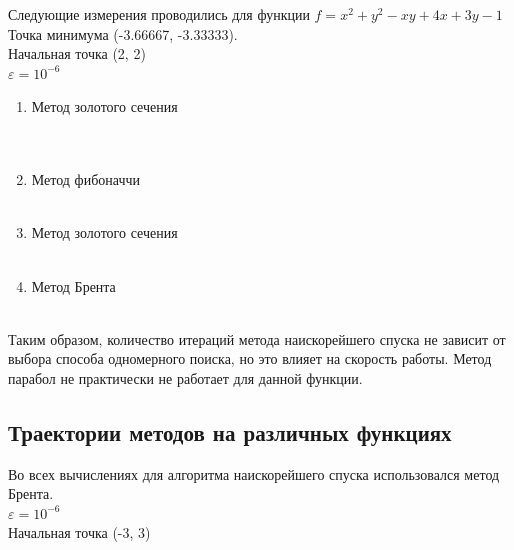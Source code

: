 Следующие измерения проводились для функции
\(f = x^2 + y^2 - xy + 4x + 3y - 1\)  \\ 
Точка минимума (-3.66667, -3.33333). \\
Начальная точка (2, 2) \\
$\varepsilon = 10^{-6}$ \\


\begin{enumerate}
	\item Метод золотого сечения \\
	\\
	 \\
	\item Метод фибоначчи \\
	\\
	\item Метод золотого сечения \\
	\\
	\item Метод Брента \\
	\\
\end{enumerate}

Таким образом, количество итераций метода наискорейшего спуска не зависит от выбора способа одномерного поиска, но это влияет на скорость работы. Метод парабол не практически не работает для данной функции.

\subsection{Траектории методов на различных функциях}
Во всех вычислениях для алгоритма наискорейшего спуска использовался метод Брента.\\
$\varepsilon = 10^{-6}$ \\
Начальная точка (-3, 3) \\

